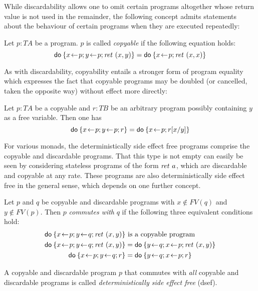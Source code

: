 While discardability allows one to omit certain programs altogether whose return
value is not used in the remainder, the following concept admits
statements about the behaviour of certain programs when they are executed
repeatedly:
\begin{defn}
  \label{defn:cp}
  Let $p : T A$ be a program. $p$ is called \emph{copyable} if the following
  equation holds:
  \[ \mathsf{do}\: \{x\!\gets\! p; y\!\gets\! p; \mathit{ret}~(x,y)\} = \mathsf{do}\: \{x\!\gets\! p; \mathit{ret}~(x,x)\}
  \] 
\end{defn}
As with discardability, copyability entails a stronger form of program equality
which expresses the fact that copyable programs may be doubled (or cancelled,
taken the opposite way) without effect more directly:
\begin{prop}
  \label{thm:cp-general}
  Let $p : T A$ be a copyable and $r : T B$ be an arbitrary program possibly
  containing $y$ as a free variable. Then one has
  \[ \mathsf{do}\: \{x\!\gets\! p; y\!\gets\! p; r\} = \mathsf{do}\: \{x\!\gets\! p; r[x/y]\} \]
\end{prop}


For various monads, the deterministically side effect free programs comprise the
copyable and discardable programs. That this type is not empty can easily be
seen by considering stateless programs of the form $\mathit{ret}~a$, which are
discardable and copyable at any rate. These programs are also deterministically
side effect free in the general sense, which depends on one further concept.
\begin{defn}
  \label{defn:commutes}
  Let $p$ and $q$ be copyable and discardable programs with $x \notin FV(q)$ and
  $y \notin FV(p)$. Then $p$ \emph{commutes with} $q$ if the following three
  equivalent conditions hold:
\begin{align}
  \label{eq:commutes-1}
  \DoStmt{x\leteq p; y\leteq q; \ret~(x,y)} &\text{ is a copyable program}\\
  \label{eq:commutes-2}
   \DoStmt{x\leteq p; y\leteq q; \ret~(x,y)} &= \DoStmt{y\leteq q; x\leteq p;
    \ret~(x,y)}\\
  \label{eq:commutes-3}
  \DoStmt{x\leteq p; y\leteq q; r} &= \DoStmt{y\leteq q; x\leteq p; r}
\end{align}
\end{defn}

\begin{defn}
  \label{defn:dsef}
  A copyable and discardable program $p$ that commutes with \emph{all} copyable
  and discardable programs is called \emph{deterministically side effect free}
  (dsef).
\end{defn}

